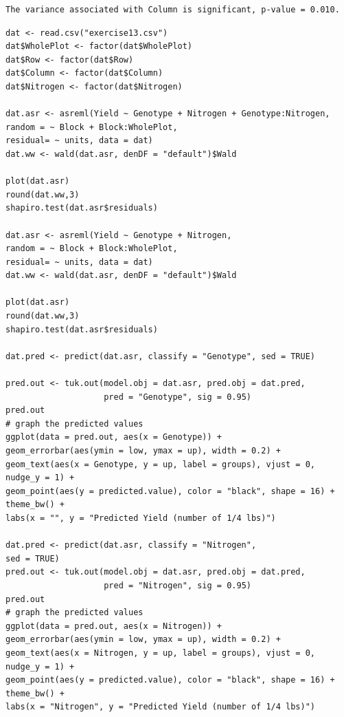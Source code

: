 \documentclass[a4paper, 10pt, fleqn, twosided]{memoir}
\begin{document}
\begin{tcolorbox}[title = Exercise 12 interpretation]
\begin{verbatim}
The variance associated with Column is significant, p-value = 0.010.
\end{verbatim}
\end{tcolorbox}
\begin{tcolorbox}[title = Exercise 13 code]
\begin{verbatim}
dat <- read.csv("exercise13.csv")
dat$WholePlot <- factor(dat$WholePlot)
dat$Row <- factor(dat$Row)
dat$Column <- factor(dat$Column)
dat$Nitrogen <- factor(dat$Nitrogen)

dat.asr <- asreml(Yield ~ Genotype + Nitrogen + Genotype:Nitrogen,
random = ~ Block + Block:WholePlot,
residual= ~ units, data = dat)
dat.ww <- wald(dat.asr, denDF = "default")$Wald

plot(dat.asr)
round(dat.ww,3)
shapiro.test(dat.asr$residuals)

dat.asr <- asreml(Yield ~ Genotype + Nitrogen,
random = ~ Block + Block:WholePlot,
residual= ~ units, data = dat)
dat.ww <- wald(dat.asr, denDF = "default")$Wald

plot(dat.asr)
round(dat.ww,3)
shapiro.test(dat.asr$residuals)

dat.pred <- predict(dat.asr, classify = "Genotype", sed = TRUE)

pred.out <- tuk.out(model.obj = dat.asr, pred.obj = dat.pred,
                    pred = "Genotype", sig = 0.95)
pred.out
# graph the predicted values 
ggplot(data = pred.out, aes(x = Genotype)) +
geom_errorbar(aes(ymin = low, ymax = up), width = 0.2) +
geom_text(aes(x = Genotype, y = up, label = groups), vjust = 0, nudge_y = 1) +
geom_point(aes(y = predicted.value), color = "black", shape = 16) + theme_bw() +
labs(x = "", y = "Predicted Yield (number of 1/4 lbs)")

dat.pred <- predict(dat.asr, classify = "Nitrogen",
sed = TRUE)
pred.out <- tuk.out(model.obj = dat.asr, pred.obj = dat.pred,
                    pred = "Nitrogen", sig = 0.95)
pred.out
# graph the predicted values 
ggplot(data = pred.out, aes(x = Nitrogen)) +
geom_errorbar(aes(ymin = low, ymax = up), width = 0.2) +
geom_text(aes(x = Nitrogen, y = up, label = groups), vjust = 0, nudge_y = 1) +
geom_point(aes(y = predicted.value), color = "black", shape = 16) + theme_bw() +
labs(x = "Nitrogen", y = "Predicted Yield (number of 1/4 lbs)")


\end{verbatim}
\end{tcolorbox}
\end{document}
